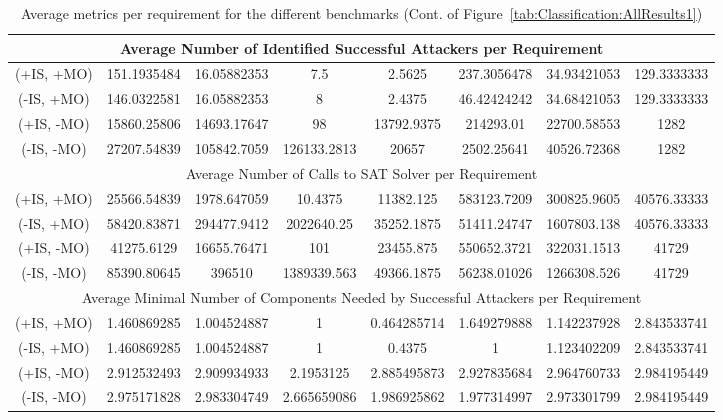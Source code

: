\begin{landscape}
\begin{table}[!t]
\begin{tabular}{|c|c|c|c|c|c|c|c|}
			\multicolumn{8}{|c|}{Average Number of Identified Successful Attackers per Requirement}                            \\ \hline
			(+IS, +MO) & 151.1935484  & 16.05882353 & 7.5         & 2.5625      & 237.3056478 & 34.93421053 & 129.3333333      \\
			(-IS, +MO) & 146.0322581  & 16.05882353 & 8           & 2.4375      & 46.42424242 & 34.68421053 & 129.3333333      \\
			(+IS, -MO) & 15860.25806  & 14693.17647 & 98          & 13792.9375  & 214293.01   & 22700.58553 & 1282             \\
			(-IS, -MO) & 27207.54839  & 105842.7059 & 126133.2813 & 20657       & 2502.25641  & 40526.72368 & 1282             \\ 
			\hline
			\multicolumn{8}{|c|}{Average Number of Calls to SAT Solver per Requirement}                                        \\ \hline
			(+IS, +MO) & 25566.54839  & 1978.647059 & 10.4375     & 11382.125   & 583123.7209 & 300825.9605 & 40576.33333      \\
			(-IS, +MO) & 58420.83871  & 294477.9412 & 2022640.25  & 35252.1875  & 51411.24747 & 1607803.138 & 40576.33333      \\
			(+IS, -MO) & 41275.6129   & 16655.76471 & 101         & 23455.875   & 550652.3721 & 322031.1513 & 41729            \\
			(-IS, -MO) & 85390.80645  & 396510      & 1389339.563 & 49366.1875  & 56238.01026 & 1266308.526 & 41729            \\ \hline
			\multicolumn{8}{|c|}{Average Minimal Number of Components Needed by Successful Attackers per Requirement}          \\ 
			\hline
			(+IS, +MO) & 1.460869285  & 1.004524887 & 1           & 0.464285714 & 1.649279888 & 1.142237928 & 2.843533741      \\
			(-IS, +MO) & 1.460869285  & 1.004524887 & 1           & 0.4375      & 1           & 1.123402209 & 2.843533741      \\
			(+IS, -MO) & 2.912532493  & 2.909934933 & 2.1953125   & 2.885495873 & 2.927835684 & 2.964760733 & 2.984195449      \\
			(-IS, -MO) & 2.975171828  & 2.983304749 & 2.665659086 & 1.986925862 & 1.977314997 & 2.973301799 & 2.984195449      \\ \hline
	\end{tabular}
		\caption{Average metrics per requirement for the different benchmarks (Cont. of Figure~\ref{tab:Classification:AllResults1})}
		\label{tab:Classification:AllResults2}
		\end{table}	
\end{landscape} 
